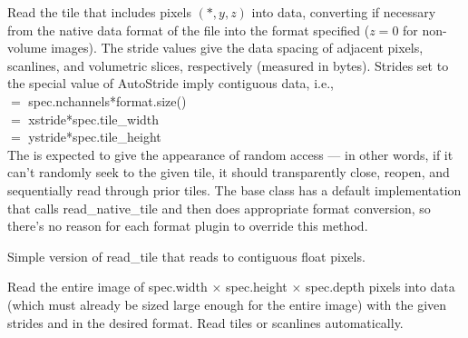 Read the tile that includes pixels $(*,y,z)$ into {\kw data}, converting
if necessary from the native data format of the file into the 
{\kw format} specified ($z=0$ for non-volume images).  The stride values
give the data spacing of adjacent pixels, scanlines, and volumetric
slices, respectively (measured in bytes).  Strides set to the special
value of {\kw AutoStride} imply contiguous data, i.e., \\
 $=$ {\kw spec.nchannels*format.size()} \\
 $=$ {\kw xstride*spec.tile_width} \\
 $=$ {\kw ystride*spec.tile_height} \\
The \ImageInput is expected to give the appearance of random access
--- in other words, if it can't randomly seek to the given tile, it
should transparently close, reopen, and sequentially read through prior
tiles.  The base \ImageInput class has a default implementation
that calls read_native_tile and then does appropriate format conversion,
so there's no reason for each format plugin to override this method.
\apiend


Simple version of {\kw read_tile} that reads to contiguous float pixels.
\apiend


Read the entire image of {\kw spec.width} $\times$ {\kw spec.height}
$\times$ {\kw spec.depth}
pixels into data (which must already be sized large enough for
the entire image) with the given strides and in the desired
format.  Read tiles or scanlines automatically.  

